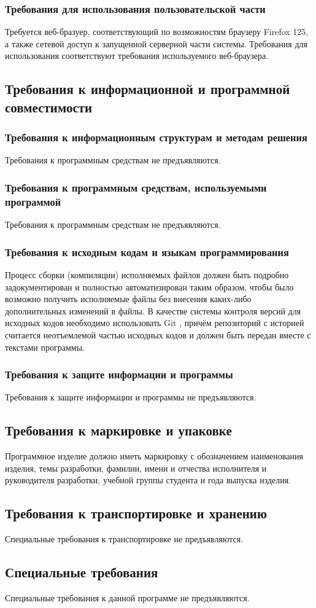    \subsubsection{Требования для использования пользовательской части}
        Требуется веб-бразуер, соответствующий по возможностям браузеру Firefox 125, а также сетевой доступ к запущенной серверной части системы. Требования для использования соответствуют требования используемого веб-браузера.

\subsection{Требования к информационной и программной совместимости}
    \subsubsection{Требования к информационным структурам и методам решения}
    	Требования к программным средствам не предъявляются.

    \subsubsection{Требования к программным средствам, используемыми программой}
    	Требования к программным средствам не предъявляются.
    
    \subsubsection{Требования к исходным кодам и языкам программирования}
    	Процесс сборки (компиляции) исполняемых файлов должен быть подробно задокументирован и полностью автоматизирован таким образом, чтобы было возможно получить исполняемые файлы без внесения каких-либо дополнительных изменений в файлы. В качестве системы контроля версий для исходных кодов необходимо использовать Git \cite{git}, причём репозиторий с историей считается неотъемлемой частью исходных кодов и должен быть передан вместе с текстами программы.

    \subsubsection{Требования к защите информации и программы}
    	Требования к защите информации и программы не предъявляются.

\subsection{Требования к маркировке и упаковке}
    Программное изделие должно иметь маркировку с обозначением наименования
    изделия, темы разработки, фамилии, имени и отчества исполнителя и
    руководителя разработки, учебной группы студента и года выпуска изделия.

\subsection{Требования к транспортировке и хранению}
    Специальные требования к транспортировке не предъявляются.

\subsection{Специальные требования}
    Специальные требования к данной программе не предъявляются.

\clearpage